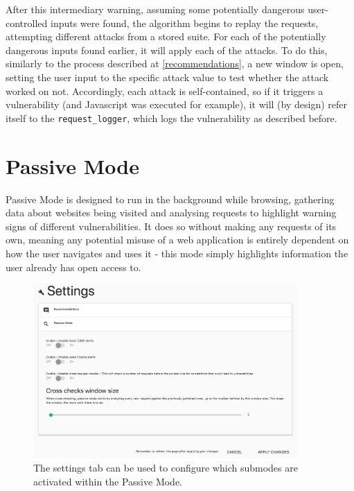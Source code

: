 After this intermediary warning, assuming some potentially dangerous user-controlled inputs were found, the algorithm begins to replay the requests, attempting different attacks from a stored suite. For each of the potentially dangerous inputs found earlier, it will apply each of the attacks. To do this, similarly to the process described at \ref{recommendations}, a new window is open, setting the user input to the specific attack value to test whether the attack worked on not. Accordingly, each attack is self-contained, so if it triggers a vulnerability (and Javascript was executed for example), it will (by design) refer itself to the \texttt{request\_logger}, which logs the vulnerability as described before.


\section{Passive Mode}

Passive Mode is designed to run in the background while browsing, gathering data about websites being visited and analysing requests to highlight warning signs of different vulnerabilities. It does so without making any requests of its own, meaning any potential misuse of a web application is entirely dependent on how the user navigates and uses it - this mode simply highlights information the user already has open access to. \\

\begin{figure}[h]
	\centering
	\includegraphics[width=0.9\textwidth]{images/passive_mode_settings.png}
	\caption{The settings tab can be used to configure which submodes are activated within the Passive Mode.}
	\label{fig:passive_mode_settings}
\end{figure}

